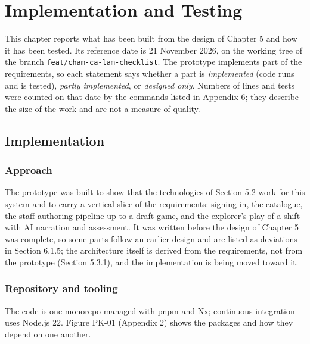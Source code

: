 \newpage
\section{Implementation and Testing}

This chapter reports what has been built from the design of Chapter 5 and how it has been tested. Its reference date is 21 November 2026, on the working tree of the branch \texttt{feat/\allowbreak{}cham-\allowbreak{}ca-\allowbreak{}lam-\allowbreak{}checklist}. The prototype implements part of the requirements, so each statement says whether a part is \textit{implemented} (code runs and is tested), \textit{partly implemented}, or \textit{designed only}. Numbers of lines and tests were counted on that date by the commands listed in Appendix 6; they describe the size of the work and are not a measure of quality.

\subsection{Implementation}

\subsubsection{Approach}

The prototype was built to show that the technologies of Section 5.2 work for this system and to carry a vertical slice of the requirements: signing in, the catalogue, the staff authoring pipeline up to a draft game, and the explorer's play of a shift with AI narration and assessment. It was written before the design of Chapter 5 was complete, so some parts follow an earlier design and are listed as deviations in Section 6.1.5; the architecture itself is derived from the requirements, not from the prototype (Section 5.3.1), and the implementation is being moved toward it.

\subsubsection{Repository and tooling}

The code is one monorepo managed with pnpm and Nx; continuous integration uses Node.js 22. Figure PK-01 (Appendix 2) shows the packages and how they depend on one another.

